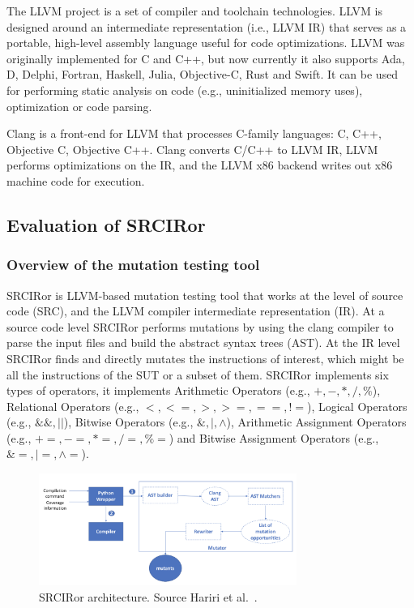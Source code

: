 The LLVM project is a set of compiler and toolchain technologies. LLVM is designed around an intermediate representation (i.e., LLVM IR) that serves as a portable, high-level assembly language useful for code optimizations. LLVM was originally implemented for C and C++, but now currently it also supports Ada, D, Delphi, Fortran, Haskell, Julia, Objective-C, Rust and Swift. It can be used for performing static analysis on code (e.g., uninitialized memory uses), optimization or code parsing.

Clang is a front-end for LLVM that processes C-family languages: C, C++, Objective C, Objective C++. Clang converts C/C++ to LLVM IR, LLVM performs optimizations on the IR, and the LLVM x86 backend writes out x86 machine code for execution.

\subsection{Evaluation of SRCIRor}
\label{subsec:srciror}

\subsubsection{Overview of the mutation testing tool}

SRCIRor is LLVM-based mutation testing tool that works at the level of source code (SRC), and the LLVM compiler intermediate representation (IR). 
At a source code level SRCIRor performs mutations by using the clang compiler to parse the input files and build the abstract syntax trees (AST). 
At the IR level SRCIRor finds and directly mutates the instructions of interest, which might be all the instructions of the SUT or a subset of them. 
SRCIRor implements six types of operators, it implements Arithmetic Operators (e.g., $+, -, *, /, \%$), Relational Operators (e.g., $<, <=, >, >=, ==, !=$), Logical Operators (e.g., $\&\&, ||$), Bitwise Operators (e.g., $\&, |, \wedge$), Arithmetic Assignment Operators (e.g., $+=, -=, *=, /=, \%=$) and Bitwise Assignment Operators (e.g., $\&=, |=, \wedge=$).

\begin{figure}[h]
	\centering
    \includegraphics[width=0.75\textwidth]{images/srciror_arch}
    \caption{SRCIRor architecture. Source Hariri et al.~\cite{hariri2018srciror}.}
    \label{fig:srciror_arch}
\end{figure}

